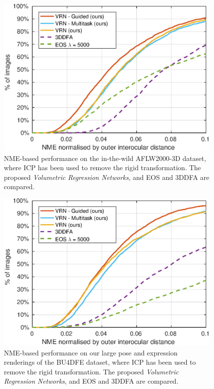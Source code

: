 \begin{figure}
  \centering
  \includegraphics[width=0.75\linewidth]{curves-icp/aflw.eps}
  \caption[NME performance on AFLW2000-3D with ICP
  Alignment]{NME-based performance on the in-the-wild AFLW2000-3D
    dataset, where ICP has been used to remove the rigid
    transformation. The proposed \textit{Volumetric Regression
      Networks}, and EOS and 3DDFA are compared.}
  \label{roc:aflw2000icp}
\end{figure}

\begin{figure}
  \centering
  \includegraphics[width=0.75\linewidth]{curves-icp/bu4dfe.eps}
  \caption[NME performance on BU4DFE with ICP Alignment]{NME-based
    performance on our large pose and expression renderings of the
    BU4DFE dataset, where ICP has been used to remove the rigid
    transformation. The proposed \textit{Volumetric Regression
      Networks}, and EOS and 3DDFA are compared.}
  \label{roc:bu4dfeicp}
\end{figure}

